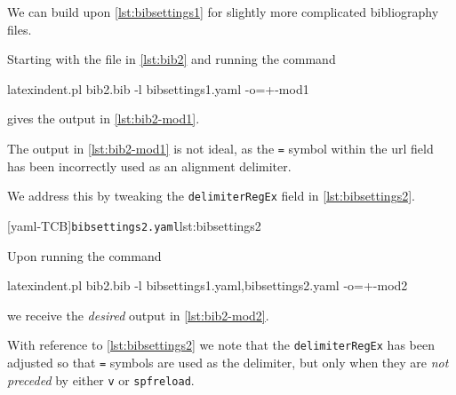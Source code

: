  \begin{example}
 We can build upon \cref{lst:bibsettings1} for slightly more complicated bibliography
 files.

 Starting with the file in \cref{lst:bib2} and running the command

 \begin{commandshell}
latexindent.pl bib2.bib -l bibsettings1.yaml -o=+-mod1 
   \end{commandshell}

 gives the output in \cref{lst:bib2-mod1}.

 \begin{widepage}
 \end{widepage}

 The output in \cref{lst:bib2-mod1} is not ideal, as the \texttt{=} symbol within the url
 field has been incorrectly used as an alignment delimiter.

 We address this by tweaking the \texttt{delimiterRegEx} field in
 \cref{lst:bibsettings2}.

 [yaml-TCB]{\texttt{bibsettings2.yaml}}{lst:bibsettings2}

 Upon running the command

 \begin{commandshell}
latexindent.pl bib2.bib -l bibsettings1.yaml,bibsettings2.yaml -o=+-mod2 
         \end{commandshell}

 we receive the \emph{desired} output in \cref{lst:bib2-mod2}.


 With reference to \cref{lst:bibsettings2} we note that the \texttt{delimiterRegEx} has
 been adjusted so that \texttt{=} symbols are used as the delimiter, but only when they
 are \emph{not preceded} by either \texttt{v} or \texttt{spfreload}.
 \end{example}

